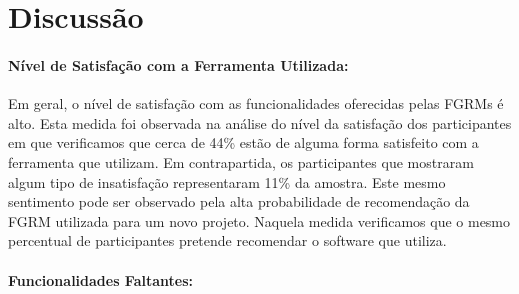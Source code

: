 \begin{table}[htpb]
\centering
{}
\caption{Classificação das funcionalidades que possam dar suporte ao uso das
práticas dos agilistas.}\label{tab:melhorias_fgrm_suporte_particas_ageis}
\end{table}

\section{Discussão}

\paragraph{Nível de Satisfação com a Ferramenta Utilizada:}\label{par:pesq_profissionais_nivel_de_satisfação}

Em geral, o nível de satisfação com as funcionalidades oferecidas pelas FGRMs é
alto. Esta medida foi observada na análise do nível da satisfação dos
participantes em que verificamos que cerca de 44\% estão de alguma forma
satisfeito com a ferramenta que utilizam. Em contrapartida, os participantes
que mostraram algum tipo de insatisfação representaram 11\% da amostra. Este
mesmo sentimento pode ser observado pela alta probabilidade de recomendação da
FGRM utilizada para um novo projeto. Naquela medida verificamos que o mesmo
percentual de participantes pretende recomendar o software que utiliza.

\paragraph{Funcionalidades Faltantes:}\label{par:pesq_profissionais_funcionalidades_faltantes}

